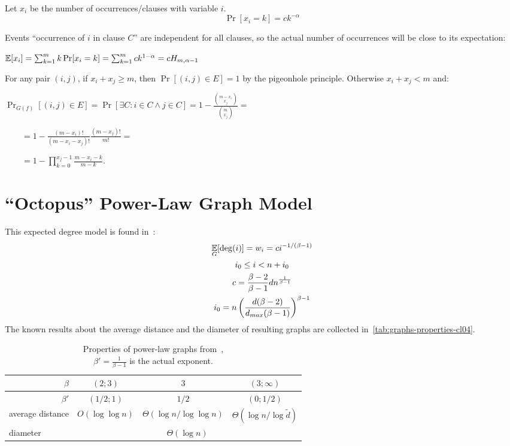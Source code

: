 Let $x_i$ be the number of occurrences/clauses with variable $i$.
\begin{equation}
    \Pr[x_i=k]=ck^{-\alpha}
\end{equation}

Events ``occurrence of $i$ in clause $C$'' are independent for all clauses,
so the actual number of occurrences will be close to its expectation:

$\mathop{{}\mathbb{E}}[x_i]=\sum_{k=1}^m{k\Pr[x_i=k]}=\sum_{k=1}^m{ck^{1-\alpha}}=cH_{m,\alpha-1}$

For any pair $(i,j)$, if $x_i+x_j\geq m$, then $\Pr[(i,j)\in E]=1$ by the pigeonhole principle.
Otherwise $x_i+x_j<m$ and:

$\Pr_{G(f)}[(i,j)\in E]=\Pr[\exists C:i\in C\land j\in C]
=1-\frac{\binom{m-x_i}{x_j}}{\binom{m}{x_j}}=$

$\qquad=1-\frac{(m-x_i)!}{(m-x_i-x_j)!}\frac{(m-x_j)!}{m!}=$

$\qquad=1-\prod_{k=0}^{x_j-1}{\frac{m-x_i-k}{m-k}}$.

\section{\texorpdfstring{``Octopus''}{"Octopus"} Power-Law Graph Model}
\label{sec:powerlaw-octopus-model}

This expected degree model is found in~\cite{cl04}:
\begin{gather}
    \mathop{{}\mathbb{E}}_G[\deg(i)]=w_i=ci^{-1/(\beta-1)}\\
    i_0\leq i<n+i_0\\
    c=\frac{\beta-2}{\beta-1}dn^{\frac{1}{\beta-1}}\\
    i_0=n\left(\frac{d(\beta-2)}{d_{max}(\beta-1)}\right)^{\beta-1}
\end{gather}
The known results about the average distance and the diameter of resulting graphs
are collected in~\autoref{tab:graphs-properties-cl04}.

\begin{table}
    \begin{center}
        \renewcommand*{\arraystretch}{1.3}
        \begin{tabular}{|l|c|c|c|}
            \hline
            \multicolumn{1}{|r|}{$\beta$} & $(2;3)$ & $3$ & $(3;\infty)$\\
            \hline
            \multicolumn{1}{|r|}{$\beta'$} & $(1/2;1)$ & $1/2$ & $(0;1/2)$\\
            \hline\hline
            average distance & $O(\log\log n)$ & $\Theta(\log n/\log\log n)$ & $\Theta(\log n/\log \tilde{d})$\\
            \hline
            diameter & \multicolumn{3}{|c|}{$\Theta(\log n)$}\\
            \hline
        \end{tabular}
        \caption[Properties of power-law graphs from~\cite{cl04}.]
                {Properties of power-law graphs from~\cite{cl04},\\$\beta'=\frac{1}{\beta-1}$ is the actual exponent.}
        \label{tab:graphs-properties-cl04}
    \end{center}
\end{table}

